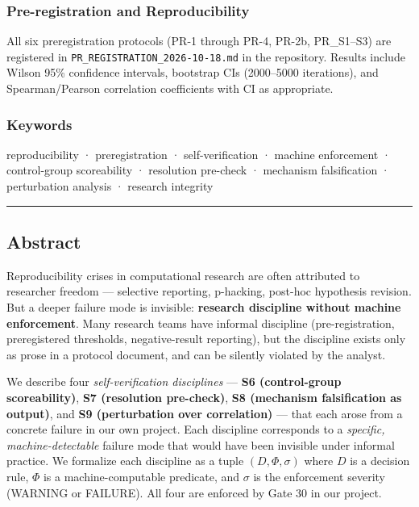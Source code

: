 \documentclass[
]{article}
\begin{document}
\subsubsection{Pre-registration and
Reproducibility}\label{pre-registration-and-reproducibility}

All six preregistration protocols (PR-1 through PR-4, PR-2b, PR\_S1--S3)
are registered in \texttt{PR\_REGISTRATION\_2026-10-18.md} in the
repository. Results include Wilson 95\% confidence intervals, bootstrap
CIs (2000--5000 iterations), and Spearman/Pearson correlation
coefficients with CI as appropriate.

\subsubsection{Keywords}\label{keywords}

reproducibility · preregistration · self-verification · machine
enforcement · control-group scoreability · resolution pre-check ·
mechanism falsification · perturbation analysis · research integrity

\begin{center}\rule{0.5\linewidth}{0.5pt}\end{center}

\subsection{Abstract}\label{abstract}

Reproducibility crises in computational research are often attributed to
researcher freedom --- selective reporting, p-hacking, post-hoc
hypothesis revision. But a deeper failure mode is invisible:
\textbf{research discipline without machine enforcement}. Many research
teams have informal discipline (pre-registration, preregistered
thresholds, negative-result reporting), but the discipline exists only
as prose in a protocol document, and can be silently violated by the
analyst.

We describe four \emph{self-verification disciplines} --- \textbf{S6
(control-group scoreability)}, \textbf{S7 (resolution pre-check)},
\textbf{S8 (mechanism falsification as output)}, and \textbf{S9
(perturbation over correlation)} --- that each arose from a concrete
failure in our own project. Each discipline corresponds to a
\emph{specific, machine-detectable} failure mode that would have been
invisible under informal practice. We formalize each discipline as a
tuple \((D, \Phi, \sigma)\) where \(D\) is a decision rule, \(\Phi\) is
a machine-computable predicate, and \(\sigma\) is the enforcement
severity (WARNING or FAILURE). All four are enforced by Gate 30 in our
project.
\end{document}
